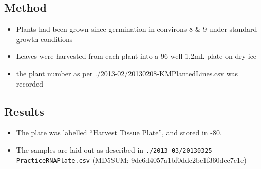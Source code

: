 \documentclass[12pt,a4paper]{book}
\begin{document}
    \subsection*{Method}
      \begin{itemize} \itemsep1pt \parskip0pt 
        \item Plants had been grown since germination in convirons 8 \& 9 under standard growth
          conditions
        \item Leaves were harvested from each plant into a 96-well 1.2mL plate on dry ice
        \item the plant number as per ./2013-02/20130208-KMPlantedLines.csv was recorded
      \end{itemize}
    \subsection*{Results}
      \begin{itemize} \itemsep1pt \parskip0pt 
        \item The plate was labelled ``Harvest Tissue Plate'', and stored in -80.
        \item The samples are laid out as described in
          \verb+./2013-03/20130325-PracticeRNAPlate.csv+ (MD5SUM: 9dc6d4057a1bf0ddc2bc1f360dec7c1c)
      \end{itemize}
\end{document}
